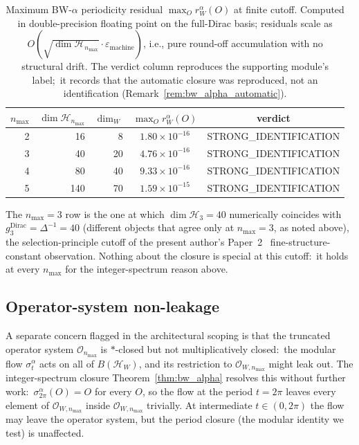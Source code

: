 \documentclass[11pt,a4paper]{article}
\theoremstyle{plain}
\theoremstyle{definition}
\newcommand{\nmax}{n_{\max}}
\newcommand{\Hilb}{\mathcal{H}}
\newcommand{\Op}{\mathcal{O}}
\begin{document}
\begin{table}[ht]
\centering
\caption{Maximum BW-$\alpha$ periodicity residual
$\max_O r_W^{\alpha}(O)$ at finite cutoff. Computed in
double-precision floating point on the full-Dirac basis;
residuals scale as
$O(\sqrt{\dim \Hilb_{\nmax}} \cdot \varepsilon_{\mathrm{machine}})$,
i.e., pure round-off accumulation with no structural drift. The
verdict column reproduces the supporting module's label;\ it records
that the automatic closure was reproduced, not an identification
(Remark~\ref{rem:bw_alpha_automatic}).}
\label{tab:bw_alpha_residuals}
\begin{tabular}{rrrcc}
\toprule
$\nmax$ & $\dim \Hilb_{\nmax}$ & $\dim_W$ &
$\max_O r_W^{\alpha}(O)$ &
verdict\\
\midrule
2 & 16  & 8  & $1.80 \times 10^{-16}$ & STRONG\_IDENTIFICATION \\
3 & 40  & 20 & $4.76 \times 10^{-16}$ & STRONG\_IDENTIFICATION \\
4 & 80  & 40 & $9.33 \times 10^{-16}$ & STRONG\_IDENTIFICATION \\
5 & 140 & 70 & $1.59 \times 10^{-15}$ & STRONG\_IDENTIFICATION \\
\bottomrule
\end{tabular}
\end{table}

The $\nmax = 3$ row is the one at which $\dim \Hilb_3 = 40$
numerically coincides with $g_3^{\mathrm{Dirac}} = \Delta^{-1} = 40$
(different objects that agree only at $\nmax = 3$, as noted above),
the selection-principle cutoff of the present author's
Paper~2~\cite{paper2} fine-structure-constant observation. Nothing
about the closure is special at this cutoff:\ it holds at every
$\nmax$ for the integer-spectrum reason above.

\subsection{Operator-system non-leakage}\label{sec:os_leakage}

A separate concern flagged in the architectural scoping is that the truncated operator system $\Op_{\nmax}$ is
$*$-closed but not multiplicatively closed:\ the modular flow
$\sigma_t^{\alpha}$ acts on all of $B(\Hilb_W)$, and its restriction
to $\Op_{W, \nmax}$ might leak out. The integer-spectrum closure
Theorem~\ref{thm:bw_alpha} resolves this without further work:\
$\sigma_{2\pi}^{\alpha}(O) = O$ for every $O$, so the flow at the
period $t = 2\pi$ leaves every element of $\Op_{W, \nmax}$ inside
$\Op_{W, \nmax}$ trivially. At intermediate $t \in (0, 2\pi)$ the flow
may leave the operator system, but the period closure (the modular
identity we test) is unaffected.
\end{document}
